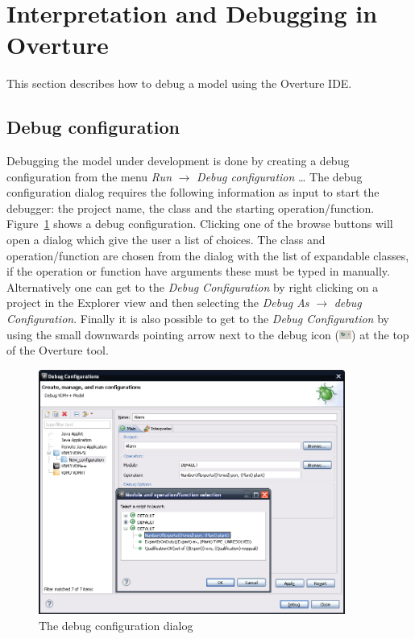 \documentclass{overturerep}
\begin{document}
{\section{Interpretation and Debugging in Overture}\label{sec:debug}

This section describes how to debug a model using the Overture IDE. 

\subsection{Debug configuration}

Debugging the model under development is done by creating a debug configuration
from the menu \emph{Run} $\rightarrow $ \emph{Debug configuration}
\ldots 
The debug
configuration dialog requires the following information as input to start the
debugger: the project name, the class and the starting operation/function.
Figure~\ref{fig:userguide:debugConfiguration} shows a debug configuration.
Clicking one of the browse buttons will open a dialog which give the user a list
of choices. The class and operation/function are chosen from the dialog with the
list of expandable classes, if the operation or function have arguments these
must be typed in manually. Alternatively one can get to the
\emph{Debug Configuration} by right clicking on a project in the
Explorer view and then selecting the \emph{Debug As} $\rightarrow$
\emph{debug Configuration}. Finally it is also possible to get to the
\emph{Debug Configuration} by using the small downwards pointing arrow
next to the debug icon
(\includegraphics[width=0.03\textwidth]{icons/debuggericon}) at the
top of the Overture tool. 

\begin{figure}[htp]
\begin{center}
  \includegraphics[width=380px]{figures/debugConfiguration}
  \caption{The debug configuration dialog}
  \label{fig:userguide:debugConfiguration}
\end{center}
\end{figure}

}
\end{document}

